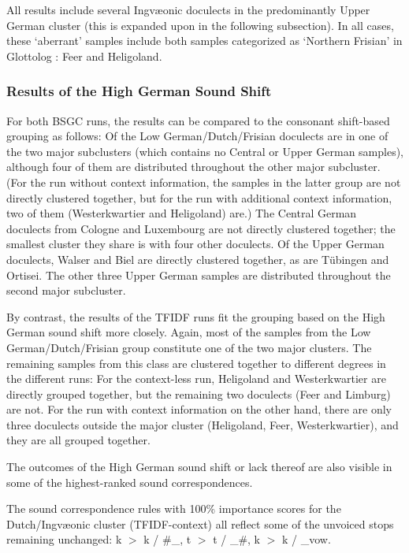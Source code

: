 \documentclass[a4paper]{article}
\begin{document}
All results include several Ingv\ae{}onic doculects
in the predominantly Upper German cluster
(this is expanded upon in the following subsection).
In all cases, these `aberrant' %
samples include both samples categorized as `Northern Frisian'
in Glottolog \citep{hammarstroem2018glottolog}: Feer and Heligoland.


\subsubsection{Results of the High German Sound Shift}

For both BSGC runs, the results can be compared to the consonant shift-based grouping as follows:
Of the Low German/Dutch/Frisian doculects are in
one of the two major subclusters %
(which contains no Central or Upper German samples),
although four of them are distributed throughout the other major subcluster.
(For the run without context information,
the samples in the latter group are not directly clustered together,
but for the run with additional context information,
two of them (Westerkwartier and Heligoland) are.)
The Central German doculects from Cologne and Luxembourg
are not directly clustered together; the smallest cluster they share
is with four other doculects.
Of the Upper German doculects,
Walser and Biel are directly clustered together,
as are T\"{u}bingen and Ortisei.
The other three Upper German samples are distributed throughout
the second major subcluster.

By contrast, the results of the TFIDF runs fit
the grouping based on the High German sound shift more closely.
Again, most of the samples from the Low German/Dutch/Frisian group
constitute one of the two major clusters.
The remaining samples from this class are clustered together
to different degrees in the different runs:
For the context-less run,
Heligoland and Westerkwartier are directly grouped together,
but the remaining two doculects (Feer and Limburg) are not.
For the run with context information on the other hand,
there are only three doculects outside the major cluster
(Heligoland, Feer, Westerkwartier),
and they are all grouped together.

The outcomes of the High German sound shift or lack thereof
are also visible in some of the highest-ranked sound correspondences.

The sound correspondence rules with 100\% importance scores
for the Dutch/Ingv\ae{}onic cluster (TFIDF-context)
all reflect some of the unvoiced stops remaining unchanged:
k $>$ k / \#\_, t $>$ t / \_\#, k $>$ k / \_vow.
\end{document}
